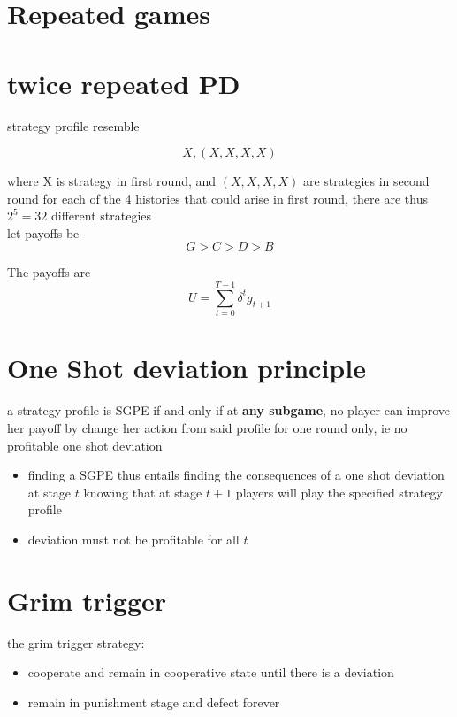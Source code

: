 \documentclass[a4paper, 10pt]{article}
\begin{document}
\section*{Repeated games}

\section{twice repeated PD}
strategy profile resemble

\[
   { X, \left(X, X, X, X\right) }
\]

where X is strategy in first round, and $(X, X, X, X)$ are strategies in second round for each of the 4 histories that could arise in first round, there are thus $2^5 = 32$ different strategies \\

let payoffs be 
\[
G > C > D > B
\]


The payoffs are 
\[
   U = \sum_{t = 0}^{T-1} \delta^t g_{t+1}
\]

\section{One Shot deviation principle}
\begin{framed}
   a strategy profile is SGPE if and only if at \textbf{any subgame}, no player can improve her payoff by change her action from said profile for one round only, ie no profitable one shot deviation
\end{framed}	
\begin{itemize}
   \item finding a SGPE thus entails finding the consequences of a one shot deviation at stage $t$ knowing that at stage $t+1$ players will play the specified strategy profile
   \item deviation must not be profitable for all $t$ 
\end{itemize}	

\section{Grim trigger}
\begin{framed}
   the grim trigger strategy: 
   \begin{itemize}
      \item cooperate and remain in cooperative state until there is a deviation
      \item remain in punishment stage and defect forever
   \end{itemize}	
\end{framed}	
\end{document}

